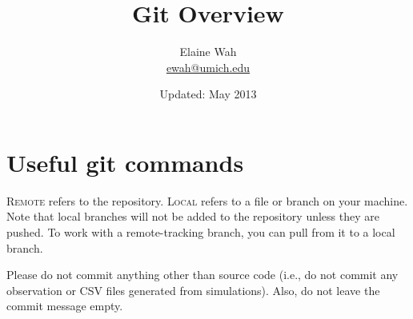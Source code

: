 \documentclass[11pt]{article}
\begin{document}
	
\title{Git Overview}
\author{
  Elaine Wah \\
  \href{mailto:ewah@umich.edu}{ewah@umich.edu}
}
\date{Updated: May 2013}
\maketitle

\section{Useful git commands}

\textsc{Remote} refers to the repository. \textsc{Local} refers to a file or branch on your machine. Note that local branches will not be added to the repository unless they are pushed. To work with a remote-tracking branch, you can pull from it to a local branch.

Please do not commit anything other than source code (i.e., do not commit any observation or CSV files generated from simulations). Also, do not leave the commit message empty.\\
\end{document}
